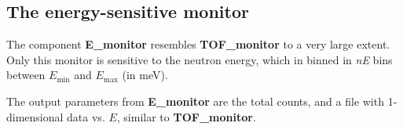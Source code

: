 \subsection*{The energy-sensitive monitor} \label{s:E_monitor}

The component \textbf{E\_monitor} resembles \textbf{TOF\_monitor}
to a very large extent. Only this monitor is sensitive to
the neutron energy, which in binned in \textit{nE} bins between
$E_\textrm{min}$ and $E_\textrm{max}$ (in meV).

The output parameters from \textbf{E\_monitor} are the total counts,
and a file with 1-dimensional data vs. $E$, similar to \textbf{TOF\_monitor}.


